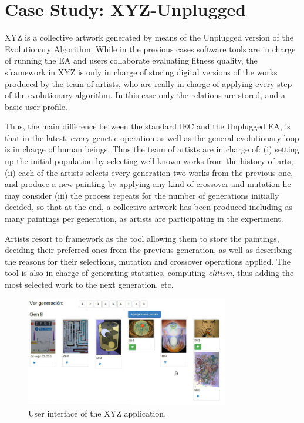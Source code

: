 \section{Case Study: XYZ-Unplugged}

XYZ is a collective artwork generated by means of the Unplugged version of the Evolutionary Algorithm.
While in the previous cases software tools are in charge of running the EA and users collaborate evaluating
fitness quality, the sframework in XYZ is only in charge of storing digital versions of the works produced 
by the team of artists, who are really in charge of applying every step of the evolutionary algorithm. In 
this case only the relations are stored, and a basic user profile. 

Thus, the main difference between the standard IEC and the Unplugged EA, is that in the latest,
every genetic operation as well as the general evolutionary loop is in charge of human beings. 
Thus the team of artists are in charge of:  (i) setting up the initial population by selecting
well known works from the history of arts;  (ii) each of the artists selects every generation two works 
from the previous one, and produce a new painting by applying any kind of crossover and mutation he may consider 
(iii) the process repeats for the number of generations initially decided, so that at the end, a collective 
artwork has been produced including as many paintings per generation, as artists are participating in the experiment.  

Artists resort to framework as the tool allowing them to store the paintings, deciding their preferred ones from the
previous generation, as well as describing the reasons for their selections, mutation and crossover operations applied.
The tool is also in charge of generating statistics, computing \textit{elitism}, thus adding the most selected work to 
the next generation, etc.

\begin{figure}[!t]
    \centering
        \includegraphics[width=3.5in]{img/interfaceXYZ.png}
    \caption{User interface of the XYZ application.}
    \label{fig:xyz}
\end{figure}

